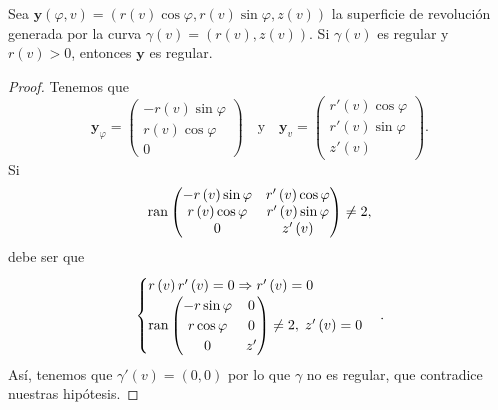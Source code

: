 \begin{lema}
Sea $\displaystyle \textbf{y} \left(\varphi, v\right)=\left(r\left(v\right)\cos\varphi, r\left(v\right)\sin\varphi, z\left(v\right)\right) $ la superficie de revolución generada por la curva $\displaystyle \gamma\left(v\right)=\left(r\left(v\right), z\left(v\right)\right) $. Si $\displaystyle \gamma\left(v\right) $ es regular y $\displaystyle r \left(v\right) > 0 $, entonces $\displaystyle \textbf{y}  $ es regular.
\end{lema}
\begin{proof}
Tenemos que 
\[ \textbf{y} _{\varphi} =\begin{pmatrix} -r\left(v\right)\sin\varphi \\ r\left(v\right)\cos\varphi \\ 0\end{pmatrix} \quad \text{y} \quad \textbf{y} _{v}=\begin{pmatrix} r'\left(v\right)\cos\varphi \\ r'\left(v\right)\sin\varphi \\ z'\left(v\right) \end{pmatrix} .\]
Si
\[\operatorname{ran}\begin{pmatrix} -r\left(v\right)\sin\varphi & r'\left(v\right)\cos\varphi \\ r\left(v\right)\cos\varphi & r'\left(v\right)\sin\varphi \\ 0 & z'\left(v\right) \end{pmatrix}\neq 2 ,\]
debe ser que 
\[
\begin{cases}
r\left(v\right)r'\left(v\right)=0 \Rightarrow r'\left(v\right)=0 \\
\operatorname{ran}\begin{pmatrix} -r\sin\varphi & 0 \\ r\cos\varphi & 0 \\ 0 & z' \end{pmatrix}\neq 2, \; z'\left(v\right)=0
\end{cases}
.\]
Así, tenemos que $\displaystyle \gamma'\left(v\right)=\left(0,0\right) $ por lo que $\displaystyle \gamma  $ no es regular, que contradice nuestras hipótesis. 
\end{proof}
